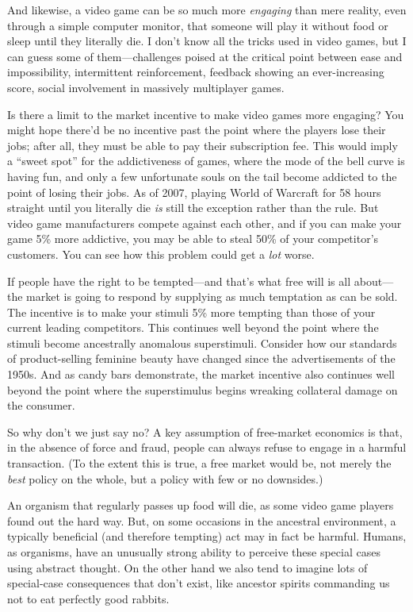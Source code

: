  And likewise, a video game can be so much more \textit{engaging}
than mere reality, even through a simple computer monitor, that someone
will play it without food or sleep until they literally die. I
don't know all the tricks used in video games, but I
can guess some of them---challenges poised at the critical point
between ease and impossibility, intermittent reinforcement, feedback
showing an ever-increasing score, social involvement in massively
multiplayer games.


 Is there a limit to the market incentive to make video games more
engaging? You might hope there'd be no incentive past
the point where the players lose their jobs; after all, they must be
able to pay their subscription fee. This would imply a
``sweet spot'' for the addictiveness
of games, where the mode of the bell curve is having fun, and only a
few unfortunate souls on the tail become addicted to the point of
losing their jobs. As of 2007, playing World of Warcraft for 58 hours
straight until you literally die \textit{is} still the exception rather
than the rule. But video game manufacturers compete against each other,
and if you can make your game 5\% more addictive, you may be able to
steal 50\% of your competitor's customers. You can see
how this problem could get a \textit{lot} worse.


 If people have the right to be tempted---and
that's what free will is all about---the market is
going to respond by supplying as much temptation as can be sold. The
incentive is to make your stimuli 5\% more tempting than those of your
current leading competitors. This continues well beyond the point where
the stimuli become ancestrally anomalous superstimuli. Consider how our
standards of product-selling feminine beauty have changed since the
advertisements of the 1950s. And as candy bars demonstrate, the market
incentive also continues well beyond the point where the superstimulus
begins wreaking collateral damage on the consumer.


 So why don't we just say no? A key assumption of
free-market economics is that, in the absence of force and fraud,
people can always refuse to engage in a harmful transaction. (To the
extent this is true, a free market would be, not merely the
\textit{best} policy on the whole, but a policy with few or no
downsides.)


 An organism that regularly passes up food will die, as some video
game players found out the hard way. But, on some occasions in the
ancestral environment, a typically beneficial (and therefore tempting)
act may in fact be harmful. Humans, as organisms, have an unusually
strong ability to perceive these special cases using abstract thought.
On the other hand we also tend to imagine lots of special-case
consequences that don't exist, like ancestor spirits
commanding us not to eat perfectly good rabbits.


